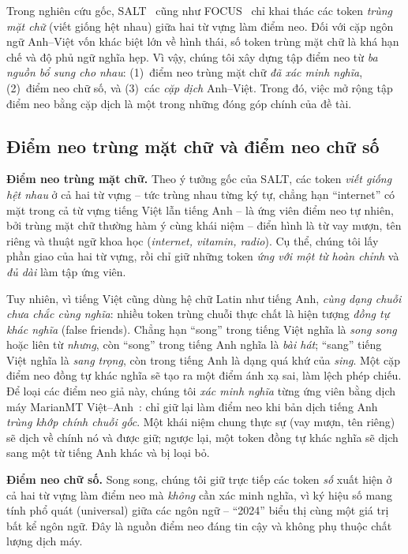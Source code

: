 Trong nghiên cứu gốc, SALT~\cite{lee2025salt} cũng như FOCUS~\cite{dobler2023focus} chỉ khai
thác các token \textit{trùng mặt chữ} (viết giống hệt nhau) giữa hai từ vựng làm điểm neo. Đối với
cặp ngôn ngữ Anh--Việt vốn khác biệt lớn về hình thái, số token trùng mặt chữ là khá hạn
chế và độ phủ ngữ nghĩa hẹp. Vì vậy, chúng tôi xây dựng tập điểm neo từ \textit{ba nguồn bổ sung
cho nhau}: (1)~điểm neo trùng mặt chữ \textit{đã xác minh nghĩa}, (2)~điểm neo chữ số, và (3)~các
\textit{cặp dịch} Anh--Việt. Trong đó, việc mở rộng tập điểm neo bằng cặp dịch là
một trong những đóng góp chính của đề tài.

\subsection{Điểm neo trùng mặt chữ và điểm neo chữ số}
\label{subsec:anchor-surface}

\textbf{Điểm neo trùng mặt chữ.} Theo ý tưởng gốc của SALT, các token \textit{viết giống hệt
nhau} ở cả hai từ vựng -- tức trùng nhau từng ký tự, chẳng hạn ``internet'' có mặt trong cả từ
vựng tiếng Việt lẫn tiếng Anh -- là ứng viên điểm neo tự nhiên, bởi trùng mặt chữ thường hàm ý cùng khái
niệm -- điển hình là từ vay mượn, tên riêng và thuật ngữ khoa học (\textit{internet, vitamin,
radio}). Cụ thể, chúng tôi lấy phần giao của hai từ vựng, rồi chỉ giữ những token
\textit{ứng với một từ hoàn chỉnh} và \textit{đủ dài} làm tập ứng viên.

Tuy nhiên, vì tiếng Việt cũng dùng hệ chữ Latin như tiếng Anh, \textit{cùng dạng chuỗi chưa
chắc cùng nghĩa}: nhiều token trùng chuỗi thực chất là hiện tượng \textit{đồng tự khác nghĩa}
(false friends). Chẳng hạn ``song'' trong tiếng Việt nghĩa là \textit{song song} hoặc liên từ
\textit{nhưng}, còn ``song'' trong tiếng Anh nghĩa là \textit{bài hát}; ``sang'' tiếng Việt
nghĩa là \textit{sang trọng}, còn trong tiếng Anh là dạng quá khứ của \textit{sing}. Một cặp
điểm neo đồng tự khác nghĩa sẽ tạo ra một điểm ánh xạ sai, làm lệch phép chiếu. Để loại
các điểm neo giả này, chúng tôi \textit{xác minh nghĩa} từng ứng viên bằng dịch máy MarianMT
Việt--Anh~\cite{junczys2018marian}: chỉ giữ lại làm điểm neo khi bản dịch tiếng Anh \textit{trùng
khớp chính chuỗi gốc}. Một khái niệm chung thực sự (vay mượn, tên riêng) sẽ dịch về chính nó
và được giữ; ngược lại, một token đồng tự khác nghĩa sẽ dịch sang một từ tiếng Anh khác và bị
loại bỏ.

\textbf{Điểm neo chữ số.} Song song, chúng tôi giữ trực tiếp các token \textit{số} xuất hiện ở cả hai
từ vựng làm điểm neo mà \textit{không} cần xác minh nghĩa, vì ký hiệu số mang tính phổ quát
(universal) giữa các ngôn ngữ -- ``2024'' biểu thị cùng một giá trị bất kể ngôn ngữ. Đây là
nguồn điểm neo đáng tin cậy và không phụ thuộc chất lượng dịch máy.

